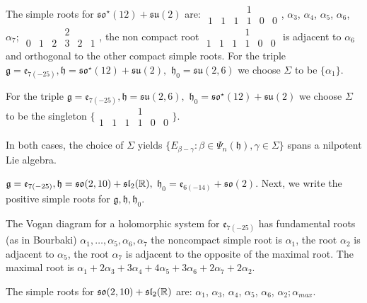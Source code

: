 \documentclass[12pt]{amsart}
\theoremstyle{definition}
\theoremstyle{remark}
\newcommand{\g}{\mathfrak{g}}
\newcommand{\h}{\mathfrak{h}}
\numberwithin{equation}{section}
\begin{document}
The simple roots for  $    \mathfrak{so}^\star(12)+\mathfrak {su}(2)$ are:
  $ \begin{smallmatrix}
   & &   & 1 &   &   \\
  1&1& 1 & 1 & 0 & 0
\end{smallmatrix}  $,   $\alpha_3$, $\alpha_4$, $\alpha_5$, $\alpha_6$, $\alpha_7$; $ \begin{smallmatrix}
   & &   & 2 &   &   \\
  0&1& 2 & 3 & 2& 1
\end{smallmatrix} $, the non compact root $ \begin{smallmatrix}
   & &   & 1 &   &   \\
  1&1& 1 & 1 & 0 & 0
\end{smallmatrix}  $ is adjacent to $\alpha_6$ and orthogonal to the other compact simple roots.
\noindent
For the triple $\g=\mathfrak e_{7(-25)},  \h=\mathfrak{so}^\star(12)+\mathfrak {su}(2), $
     $  \h_0 = \mathfrak {su}(2,6)   $ we choose $\Sigma$ to be $\{\alpha_1\}$.

For the triple $\g=\mathfrak e_{7(-25)},  \h=\mathfrak {su}(2,6) , $
     $  \h_0 = \mathfrak{so}^\star(12)+\mathfrak {su}(2)    $ we choose $\Sigma$ to be the singleton $ \{\begin{smallmatrix}
   & &   & 1 &   &   \\
  1&1& 1 & 1 & 0 & 0
\end{smallmatrix} \} $.


  In both cases, the choice of  $\Sigma$   yields $\{E_{\beta -\gamma} : \beta \in \Psi_n(\h), \gamma \in \Sigma\}$ spans a nilpotent Lie algebra.

\smallskip

 $\g=\mathfrak e_{7(-25)},  \h=\mathfrak{so}(2,10)+\mathfrak {sl}_2(\Bbb R), $
     $  \h_0 = \mathfrak {e}_{6(-14)}+\mathfrak{so}(2)   $. Next, we write the positive simple roots for $\g, \h, \h_0$.

  The Vogan diagram for a holomorphic system for $\mathfrak e_{7(-25)}$ has fundamental roots (as in Bourbaki) $\alpha_1, \dots, \alpha_5, \alpha_6,  \alpha_7$  the noncompact simple root is $\alpha_1$, the root $\alpha_2$ is  adjacent to  $\alpha_5$, the root $\alpha_7$ is  adjacent to the opposite of the maximal root. The maximal root is $\alpha_1 +2\alpha_3 +3 \alpha_4+4 \alpha_5+3\alpha_6 +2\alpha_7 +2\alpha_2$.


The simple roots for  $    \mathfrak {so}(2,10) +\mathfrak{sl}_2(\Bbb R)  $ are:  $\alpha_1$, $\alpha_3$, $\alpha_4$, $\alpha_5$, $\alpha_6$, $\alpha_2; \alpha_{max}$.
\end{document}
